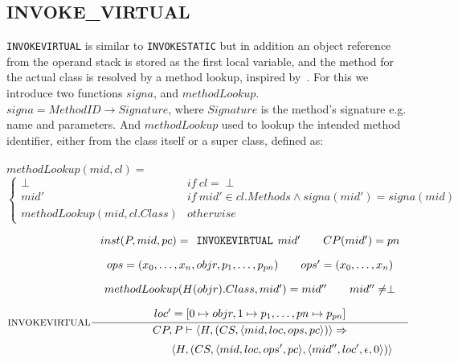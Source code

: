 \subsection{INVOKE\_VIRTUAL}
\label{app:invokevirtual}
\texttt{INVOKEVIRTUAL} is similar to \texttt{INVOKESTATIC} but in addition an object reference from the operand stack is stored as the first local variable, and the method for the actual class is resolved by a method lookup, inspired by~\cite{dalvik}. For this we introduce two functions $signa$, and $methodLookup$. $signa = MethodID \to Signature$, where $Signature$ is the method's signature e.g. name and parameters. And $methodLookup$ used to lookup the intended method identifier, either from the class itself or a super class, defined as: \\\\
$methodLookup(mid, cl) = $ \vspace{-10px}
\[
\begin{cases}
  \perp & if\ cl = \perp \\
  mid'  & if\ mid' \in cl.Methods \wedge signa(mid') = signa (mid)  \\
  methodLookup(mid, cl.Class) & otherwise
\end{cases}
\]


$$\inference[INVOKEVIRTUAL]{
inst(P,mid,pc) = \texttt{INVOKEVIRTUAL }mid' \semsp 
CP(mid') = pn \semnl \\
ops = (x_0, \ldots, x_n, objr, p_1, \ldots, p_{pn}) \semsp
ops' = (x_0, \ldots, x_{n}) \semnl\\ 
methodLookup(H(objr).Class, mid') = mid'' \semsp
mid'' \neq \perp \semnl\\
loc' = [0 \mapsto objr, 1 \mapsto p_{1}, \ldots, pn \mapsto p_{pn}]
}
{CP, P \vdash \langle H, (CS, \langle mid, loc, ops, pc \rangle)\rangle \Rightarrow }$$
$$\hspace{130px}\langle H, (CS, \langle mid, loc, ops', pc \rangle, \langle mid'', loc', \epsilon, 0 \rangle)\rangle$$
